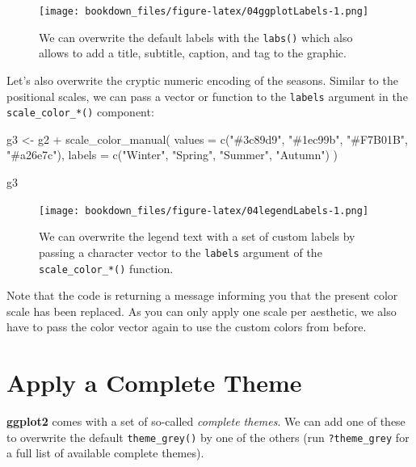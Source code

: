 \documentclass[
]{krantz}
\makeatletter
\newenvironment{Shaded}{\begin{snugshade}}{\end{snugshade}}
\newcommand{\AttributeTok}[1]{\textcolor[rgb]{0.61,0.61,0.61}{#1}}
\newcommand{\FunctionTok}[1]{\textcolor[rgb]{0,0,0}{#1}}
\newcommand{\NormalTok}[1]{#1}
\newcommand{\OtherTok}[1]{\textcolor[rgb]{0.37,0.37,0.37}{#1}}
\newcommand{\SpecialCharTok}[1]{\textcolor[rgb]{0,0,0}{#1}}
\newcommand{\StringTok}[1]{\textcolor[rgb]{0.5,0.5,0.5}{#1}}
\newenvironment{kframe}{%
\medskip{}
\setlength{\fboxsep}{.8em}
 \def\at@end@of@kframe{}%
 \ifinner\ifhmode%
  \def\at@end@of@kframe{\end{minipage}}%
  \begin{minipage}{\columnwidth}%
 \fi\fi%
 \def\FrameCommand##1{\hskip\@totalleftmargin \hskip-\fboxsep
 \colorbox{shadecolor}{##1}\hskip-\fboxsep
     \hskip-\linewidth \hskip-\@totalleftmargin \hskip\columnwidth}%
 \MakeFramed {\advance\hsize-\width
   \@totalleftmargin\z@ \linewidth\hsize
   \@setminipage}}%
 {\par\unskip\endMakeFramed%
 \at@end@of@kframe}
\renewenvironment{Shaded}{\begin{kframe}}{\end{kframe}}
\makeatother
\begin{document}
\begin{figure}
\centering
\texttt{[image: bookdown\_files/figure-latex/04ggplotLabels-1.png]}
\caption{\label{fig:04ggplotLabels}We can overwrite the default labels with the \texttt{labs()} which also allows to add a title, subtitle, caption, and tag to the graphic.}
\end{figure}

Let's also overwrite the cryptic numeric encoding of the seasons. Similar to the positional scales, we can pass a vector or function to the \texttt{labels} argument in the \texttt{scale\_color\_*()} component:

\begin{Shaded}
\begin{Highlighting}[]
\NormalTok{g3 }\OtherTok{\textless{}{-}}\NormalTok{ g2 }\SpecialCharTok{+}
  \FunctionTok{scale\_color\_manual}\NormalTok{(}
    \AttributeTok{values =} \FunctionTok{c}\NormalTok{(}\StringTok{"\#3c89d9"}\NormalTok{, }\StringTok{"\#1ec99b"}\NormalTok{, }\StringTok{"\#F7B01B"}\NormalTok{, }\StringTok{"\#a26e7c"}\NormalTok{),}
    \AttributeTok{labels =} \FunctionTok{c}\NormalTok{(}\StringTok{"Winter"}\NormalTok{, }\StringTok{"Spring"}\NormalTok{, }\StringTok{"Summer"}\NormalTok{, }\StringTok{"Autumn"}\NormalTok{)}
\NormalTok{  )}

\NormalTok{g3}
\end{Highlighting}
\end{Shaded}

\begin{figure}
\centering
\texttt{[image: bookdown\_files/figure-latex/04legendLabels-1.png]}
\caption{\label{fig:04legendLabels}We can overwrite the legend text with a set of custom labels by passing a character vector to the \texttt{labels} argument of the \texttt{scale\_color\_*()} function.}
\end{figure}

Note that the code is returning a message informing you that the present color scale has been replaced. As you can only apply one scale per aesthetic, we also have to pass the color vector again to use the custom colors from before.

\hypertarget{complete-themes}{%
\section{Apply a Complete Theme}\label{complete-themes}}

\textbf{ggplot2} comes with a set of so-called \emph{complete themes}. We can add one of these to overwrite the default \texttt{theme\_grey()} by one of the others (run \texttt{?theme\_grey} for a full list of available complete themes).
\end{document}
